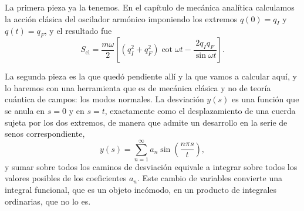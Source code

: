         La primera pieza ya la tenemos. En el capítulo de mecánica analítica calculamos la acción clásica del oscilador armónico imponiendo los extremos $q(0)=q_{I}$ y $q(t)=q_{F}$, y el resultado fue
        \begin{equation}\label{eq:AccionOsciladorAqui}
            S_{\mathrm{cl}} = \frac{m\omega}{2}\left[\left(q_{I}^{2}+q_{F}^{2}\right)\cot\omega t - \frac{2q_{I}q_{F}}{\sin\omega t}\right].
        \end{equation}

        La segunda pieza es la que quedó pendiente allí y la que vamos a calcular aquí, y lo haremos con una herramienta que es de mecánica clásica y no de teoría cuántica de campos: los modos normales. La desviación $y(s)$ es una función que se anula en $s=0$ y en $s=t$, exactamente como el desplazamiento de una cuerda sujeta por los dos extremos, de manera que admite un desarrollo en la serie de senos correspondiente,
        \begin{equation}\label{eq:SerieSenos}
            y(s) = \sum_{n=1}^{\infty} a_{n}\sin\left(\frac{n\pi s}{t}\right),
        \end{equation}
        y sumar sobre todos los caminos de desviación equivale a integrar sobre todos los valores posibles de los coeficientes $a_{n}$. Este cambio de variables convierte una integral funcional, que es un objeto incómodo, en un producto de integrales ordinarias, que no lo es.

